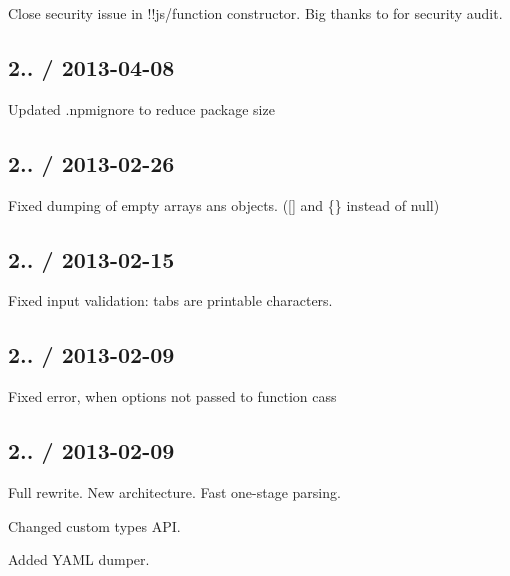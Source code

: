 
\begin{DoxyItemize}
\item Close security issue in !!js/function constructor. Big thanks to  for security audit.
\end{DoxyItemize}

\subsection*{2.. / 2013-\/04-\/08 }


\begin{DoxyItemize}
\item Updated .npmignore to reduce package size
\end{DoxyItemize}

\subsection*{2.. / 2013-\/02-\/26 }


\begin{DoxyItemize}
\item Fixed dumping of empty arrays ans objects. (\mbox{[}\mbox{]} and \{\} instead of null)
\end{DoxyItemize}

\subsection*{2.. / 2013-\/02-\/15 }


\begin{DoxyItemize}
\item Fixed input validation\+: tabs are printable characters.
\end{DoxyItemize}

\subsection*{2.. / 2013-\/02-\/09 }


\begin{DoxyItemize}
\item Fixed error, when options not passed to function cass
\end{DoxyItemize}

\subsection*{2.. / 2013-\/02-\/09 }


\begin{DoxyItemize}
\item Full rewrite. New architecture. Fast one-\/stage parsing.
\item Changed custom types A\+P\+I.
\item Added Y\+A\+M\+L dumper.
\end{DoxyItemize}

